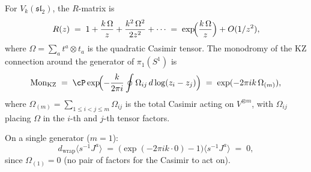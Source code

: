 \begin{computation}
\begin{enumerate}[label=\textup{(\alph*)}]
 For $V_k(\mathfrak{sl}_2)$, the $R$-matrix is
 \begin{equation}\label{eq:sl2-ann-Rmatrix}
 R(z) \;=\; 1 + \frac{k\,\Omega}{z}
 + \frac{k^2\,\Omega^2}{2z^2} + \cdots
 \;=\; \exp\!\Bigl(\frac{k\,\Omega}{z}\Bigr)
 + O(1/z^2),
 \end{equation}
 where $\Omega = \sum_a t^a \otimes t_a$
 is the quadratic Casimir tensor.
 The monodromy of the KZ connection around the
 generator of $\pi_1(S^1)$ is
 \begin{equation}\label{eq:sl2-ann-KZ-monodromy}
 \mathrm{Mon}_{\mathrm{KZ}}
 \;=\;
 \cP\exp\!\Bigl(
 -\frac{k}{2\pi i}
 \oint \Omega_{ij}\, d\log(z_i - z_j)
 \Bigr)
 \;=\;
 \exp(-2\pi ik\,\Omega_{(m)}),
 \end{equation}
 where $\Omega_{(m)} = \sum_{1 \le i < j \le m}
 \Omega_{ij}$ is the total Casimir acting on
 $V^{\otimes m}$, with $\Omega_{ij}$ placing
 $\Omega$ in the $i$-th and $j$-th tensor factors.

 On a single generator ($m=1$):
 \[
 d_{\mathrm{wrap}}\langle s^{-1}J^a \rangle
 \;=\;
 \bigl(\exp(-2\pi ik\cdot 0) - 1\bigr)
 \langle s^{-1}J^a \rangle
 \;=\; 0,
 \]
 since $\Omega_{(1)} = 0$ (no pair of factors for
 the Casimir to act on).


\end{enumerate}
\end{computation}
